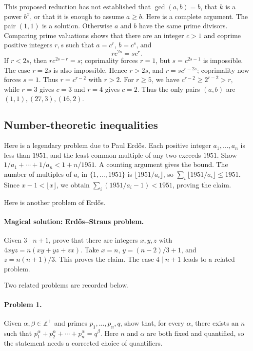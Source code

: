 \documentclass[11pt,a4paper]{article}
\begin{document}
This proposed reduction has not established that $\gcd(a,b)=b$, that
$k$ is a power $b^x$, or that it is enough to assume $a\geq b$.
Here is a complete argument.
The pair $(1,1)$ is a solution. Otherwise $a$ and $b$ have the same prime divisors.
Comparing prime valuations shows that there are an integer $c>1$ and coprime positive integers $r,s$ such that
$a=c^r$, $b=c^s$, and
\[
r c^{2s}=s c^r.
\]
If $r<2s$, then $r c^{2s-r}=s$; coprimality forces $r=1$, but $s=c^{2s-1}$ is impossible.
The case $r=2s$ is also impossible. Hence $r>2s$, and
$r=s c^{r-2s}$; coprimality now forces $s=1$.
Thus $r=c^{r-2}$ with $r>2$. For $r\geq5$, we have $c^{r-2}\geq2^{r-2}>r$, while
$r=3$ gives $c=3$ and $r=4$ gives $c=2$.
Thus the only pairs $(a,b)$ are $(1,1),(27,3),(16,2)$.

\subsection{Number-theoretic inequalities}
Here is a legendary problem due to Paul Erd\H{o}s.
Each positive integer $a_1,\ldots,a_n$ is less than $1951$, and the least common multiple of any two exceeds $1951$.
Show $1/a_1+\cdots+1/a_n<1+n/1951$.
A counting argument gives the bound.
The number of multiples of $a_i$ in $\{1,\ldots,1951\}$ is $\lfloor1951/a_i\rfloor$, so
$\sum_i\lfloor1951/a_i\rfloor\leq1951$.
Since $x-1<\lfloor x\rfloor$, we obtain
$\sum_i(1951/a_i-1)<1951$, proving the claim.

Here is another problem of Erd\H{o}s.
\paragraph{Magical solution: Erd\H{o}s--Straus problem.}
Given $3\mid n+1$, prove that there are integers $x,y,z$ with $4xyz=n(xy+yz+zx)$.
Take $x=n$, $y=(n-2)/3+1$, and $z=n(n+1)/3$.
This proves the claim. The case $4\mid n+1$ leads to a related problem.

Two related problems are recorded below.
\paragraph{Problem 1.}
Given $\alpha,\beta\in\mathbb Z^+$ and primes $p_1,\ldots,p_n,q$, show that, for every $\alpha$, there exists an $n$ such that
$p_1^\alpha+p_2^\alpha+\cdots+p_n^\alpha=q^\beta$.
Here $n$ and $\alpha$ are both fixed and quantified, so the statement needs a corrected choice of quantifiers.
\end{document}
